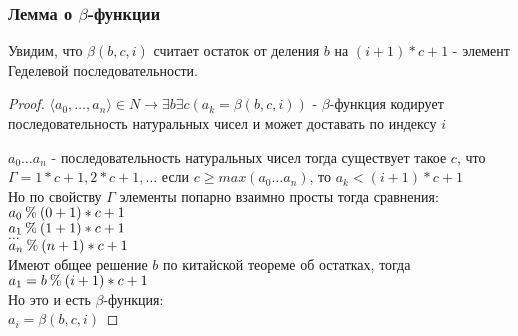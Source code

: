 \subsubsection{Лемма о \texorpdfstring{$\beta$}{бета}-функции}
\label{sec-11-3-3}
\begin{lemma}
Увидим, что $\beta(b,c,i)$ считает остаток от деления $b$ на
$(i + 1) * c + 1$ - элемент Геделевой последовательности.
\end{lemma}
\begin{proof}
$\langle a_0, \dotsc, a_n \rangle \in N \to \exists b \exists c (a_k=\beta(b,c,i))$ - $\beta$-функция кодирует
последовательность натуральных чисел и может
доставать по индексу $i$

$a_0 \ldots a_n$  - последовательность натуральных чисел
тогда существует такое $c$, что $\Gamma = 1 * c + 1, 2 * c + 1,\ldots$
если $c \geq max(a_0 \ldots a_n)$, то $a_k < (i + 1) * c + 1$\\
Но по свойству $\Gamma$ элементы попарно взаимно просты
тогда сравнения:\\
$a_0 \mathbin{\%} (0+1)*c+1$\\
$a_1 \mathbin{\%} (1+1)*c+1$\\
$\ldots$\\
$a_n \mathbin{\%} (n + 1) * c + 1$\\
Имеют общее решение $b$ по китайской теореме об остатках, тогда $a_1 = b \mathbin{\%} (i+1)*c + 1$\\
Но это и есть $\beta$-функция:\\
$a_i = \beta(b,c,i)$
\end{proof}
